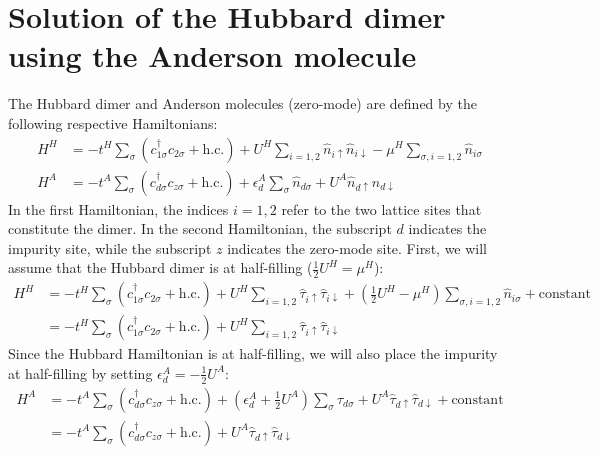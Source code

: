 \documentclass{article}
\numberwithin{equation}{section}
\begin{document}
\section{Solution of the Hubbard dimer using the Anderson molecule}
The Hubbard dimer and Anderson molecules (zero-mode) are defined by the following respective Hamiltonians:
\begin{equation}\begin{aligned}
	H^H &= -t^H\sum_{\sigma}\left(c^\dagger_{1\sigma}c_{2\sigma} + \text{h.c.}\right) + U^H\sum_{i=1,2}\hat n_{i \uparrow}\hat n_{i \downarrow} - \mu^H \sum_{\sigma, i=1,2}\hat n_{i\sigma}\\
	H^A &= -t^A\sum_{\sigma}\left(c^\dagger_{d\sigma}c_{z\sigma} + \text{h.c.}\right) + \epsilon_d^A \sum_{\sigma}\hat n_{d\sigma} + U^A\hat n_{d \uparrow}\hat n_{d \downarrow}
\end{aligned}\end{equation}
In the first Hamiltonian, the indices \(i=1,2\) refer to the two lattice sites that constitute the dimer. In the second Hamiltonian, the subscript \(d\) indicates the impurity site, while the subscript \(z\) indicates the zero-mode site. First, we will assume that the Hubbard dimer is at half-filling (\(\frac{1}{2}U^H = \mu^H\)):
\begin{equation}\begin{aligned}
	\label{hubb_dimer}
	H^H &= -t^H\sum_{\sigma}\left(c^\dagger_{1\sigma}c_{2\sigma} + \text{h.c.}\right) + U^H\sum_{i=1,2}\hat \tau_{i \uparrow}\hat \tau_{i \downarrow} + \left(\frac{1}{2}U^H- \mu^H\right) \sum_{\sigma, i=1,2}\hat n_{i\sigma} + \text{constant}\\
	    &= -t^H\sum_{\sigma}\left(c^\dagger_{1\sigma}c_{2\sigma} + \text{h.c.}\right) + U^H\sum_{i=1,2}\hat \tau_{i \uparrow}\hat \tau_{i \downarrow}
\end{aligned}\end{equation}
Since the Hubbard Hamiltonian is at half-filling, we will also place the impurity at half-filling by setting \(\epsilon_d^A = -\frac{1}{2}U^A\):
\begin{equation}\begin{aligned}
	\label{and_dimer}
	H^A &= -t^A\sum_{\sigma}\left(c^\dagger_{d\sigma}c_{z\sigma} + \text{h.c.}\right) + \left(\epsilon_d^A + \frac{1}{2}U^A\right) \sum_{\sigma}\hat \tau_{d\sigma} + U^A\hat \tau_{d \uparrow}\hat \tau_{d \downarrow} + \text{constant}\\
	    &= -t^A\sum_{\sigma}\left(c^\dagger_{d\sigma}c_{z\sigma} + \text{h.c.}\right) + U^A\hat \tau_{d \uparrow}\hat \tau_{d \downarrow}
\end{aligned}\end{equation}
\end{document}
